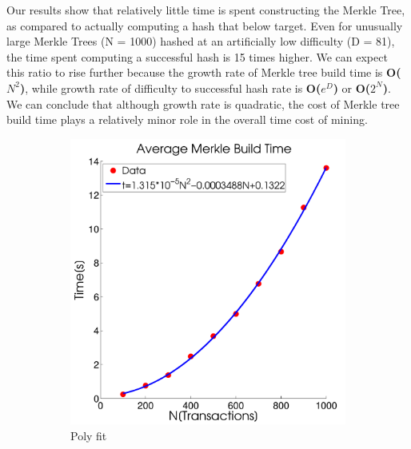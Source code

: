 \documentclass[pdftex,11pt]{article}
\begin{document}
Our results show that relatively little time is spent constructing the Merkle Tree, as compared to actually computing a hash that below target. Even for unusually large Merkle Trees (N = 1000) hashed at an artificially low difficulty (D = 81), the time spent computing a successful hash is 15 times higher. We can expect this ratio to rise further because the growth rate of Merkle tree build time is {\bf O($N^2$)}, while growth rate of difficulty to successful hash rate is {\bf O($e^D$)} or {\bf O($2^N$)}. We can conclude that although growth rate is quadratic, the cost of Merkle tree build time plays a relatively minor role in the overall time cost of mining.


\begin{figure}[H]
	\centering
	\begin{subfigure}[H]{0.4\textwidth}
		\includegraphics[width=\textwidth]{figures/MerkPoly.pdf}
		\caption{Poly fit}
	\end{subfigure}
	\begin{subfigure}[H]{0.4\textwidth}

\end{subfigure}
\end{figure}
\end{document}
